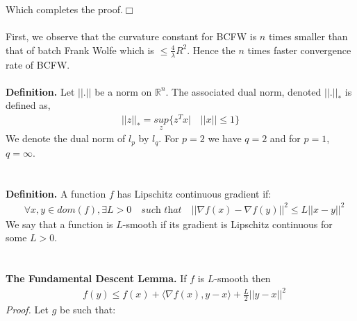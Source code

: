\documentclass{article}
\begin{document}
Which completes the proof.\quad$\Box$
\\
\\
First, we observe that the curvature constant for BCFW is $n$ times smaller than that of batch Frank Wolfe which is $\leq \frac{4}{\lambda}R^{2}$. Hence the $n$ times faster convergence rate of BCFW.
\\
\\
\textbf{Definition.} Let $||.||$ be a norm on $\mathbb{R}^{n}$. The associated dual norm, denoted $||.||_{*}$ is defined as,
\begin{equation*}
\begin{aligned}
    ||z||_{*}= \underset{z}{\textit{sup}} \{z^{T}x|\quad||x||\leq1\}
\end{aligned}
\end{equation*}
We denote the dual norm of $l_{p}$ by $l_{q}$. For $p=2$ we have $q=2$ and for $p=1$, $q=\infty$.
\\
\\
\\
\textbf{Definition.} A function $f$ has Lipschitz continuous gradient if: 
\begin{equation*}
\begin{aligned}
    &\forall x,y \in dom(f), \exists L >0 \quad\textit{such that}\quad ||\nabla f(x) -\nabla f(y)||^2 \leq L||x - y||^2
\end{aligned}
\end{equation*}
We say that a function is $L$-smooth if its gradient is Lipschitz continuous for some $L >0$.\\
\\
\\
\textbf{The Fundamental Descent Lemma.} If $f$ is $L$-smooth then
\begin{equation*}
\begin{aligned}
    &f(y) \leq f(x) + \langle \nabla f(x), y-x\rangle + \frac{L}{2}||y - x||^2
\end{aligned}
\end{equation*}
\textit{Proof. } Let $g$ be such that: 
\end{document}
